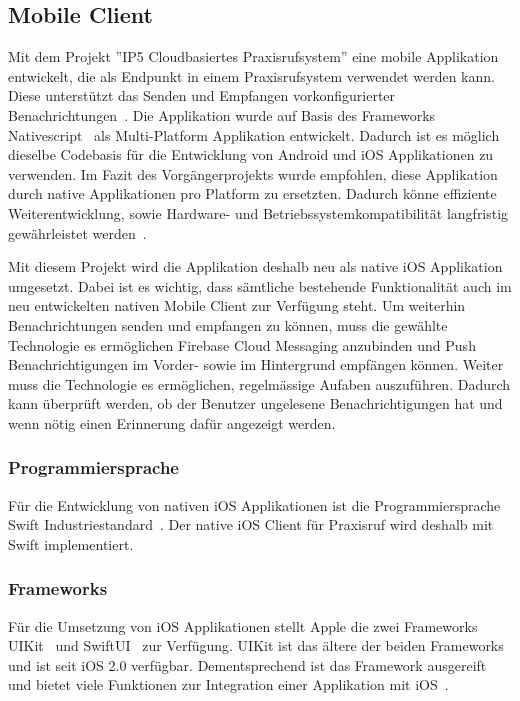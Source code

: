 
\subsection{Mobile Client}

Mit dem Projekt ''IP5 Cloudbasiertes Praxisrufsystem'' eine mobile Applikation entwickelt, die als Endpunkt in einem Praxisrufsystem verwendet werden kann.
Diese unterstützt das Senden und Empfangen vorkonfigurierter Benachrichtungen~\cite{ip5}.
Die Applikation wurde auf Basis des Frameworks Nativescript~\cite{nativescript} als Multi-Platform Applikation entwickelt.
Dadurch ist es möglich dieselbe Codebasis für die Entwicklung von Android und iOS Applikationen zu verwenden.
Im Fazit des Vorgängerprojekts wurde empfohlen, diese Applikation durch native Applikationen pro Platform zu ersetzten.
Dadurch könne effiziente Weiterentwicklung, sowie Hardware- und Betriebssystemkompatibilität langfristig gewährleistet werden~\cite{ip5}.

Mit diesem Projekt wird die Applikation deshalb neu als native iOS Applikation umgesetzt.
Dabei ist es wichtig, dass sämtliche bestehende Funktionalität auch im neu entwickelten nativen Mobile Client zur Verfügung steht.
Um weiterhin Benachrichtungen senden und empfangen zu können, muss die gewählte Technologie es ermöglichen Firebase Cloud Messaging anzubinden
und Push Benachrichtigungen im Vorder- sowie im Hintergrund empfängen können.
Weiter muss die Technologie es ermöglichen, regelmässige Aufaben auszuführen.
Dadurch kann überprüft werden, ob der Benutzer ungelesene Benachrichtigungen hat und wenn nötig einen Erinnerung dafür angezeigt werden.

\subsubsection{Programmiersprache}

Für die Entwicklung von nativen iOS Applikationen ist die Programmiersprache Swift Industriestandard~\cite{ios_swift}.
Der native iOS Client für Praxisruf wird deshalb mit Swift implementiert.

\subsubsection{Frameworks}

Für die Umsetzung von iOS Applikationen stellt Apple die zwei Frameworks UIKit~\cite{ios_uikit} und SwiftUI~\cite{ios_swift_ui} zur Verfügung.
UIKit ist das ältere der beiden Frameworks und ist seit iOS 2.0 verfügbar.
Dementsprechend ist das Framework ausgereift und bietet viele Funktionen zur Integration einer Applikation mit iOS~\cite{ios_uikit}.

